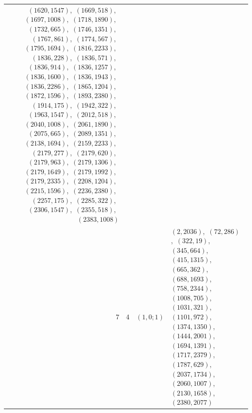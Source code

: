\documentclass[11pt]{article}
\begin{document}
\begin{longtable}{@{}rrl>{\raggedright\arraybackslash}p{}@{}}
$(1620,1547)$,\allowbreak\ $(1669,518)$,\allowbreak\ $(1697,1008)$,\allowbreak\ $(1718,1890)$,\allowbreak\ $(1732,665)$,\allowbreak\ $(1746,1351)$,\allowbreak\ $(1767,861)$,\allowbreak\ $(1774,567)$,\allowbreak\ $(1795,1694)$,\allowbreak\ $(1816,2233)$,\allowbreak\ $(1836,228)$,\allowbreak\ $(1836,571)$,\allowbreak\ $(1836,914)$,\allowbreak\ $(1836,1257)$,\allowbreak\ $(1836,1600)$,\allowbreak\ $(1836,1943)$,\allowbreak\ $(1836,2286)$,\allowbreak\ $(1865,1204)$,\allowbreak\ $(1872,1596)$,\allowbreak\ $(1893,2380)$,\allowbreak\ $(1914,175)$,\allowbreak\ $(1942,322)$,\allowbreak\ $(1963,1547)$,\allowbreak\ $(2012,518)$,\allowbreak\ $(2040,1008)$,\allowbreak\ $(2061,1890)$,\allowbreak\ $(2075,665)$,\allowbreak\ $(2089,1351)$,\allowbreak\ $(2138,1694)$,\allowbreak\ $(2159,2233)$,\allowbreak\ $(2179,277)$,\allowbreak\ $(2179,620)$,\allowbreak\ $(2179,963)$,\allowbreak\ $(2179,1306)$,\allowbreak\ $(2179,1649)$,\allowbreak\ $(2179,1992)$,\allowbreak\ $(2179,2335)$,\allowbreak\ $(2208,1204)$,\allowbreak\ $(2215,1596)$,\allowbreak\ $(2236,2380)$,\allowbreak\ $(2257,175)$,\allowbreak\ $(2285,322)$,\allowbreak\ $(2306,1547)$,\allowbreak\ $(2355,518)$,\allowbreak\ $(2383,1008)$\\
7 & 4 & $(1,0;1)$ & $(2,2036)$,\allowbreak\ $(72,286)$,\allowbreak\ $(322,19)$,\allowbreak\ $(345,664)$,\allowbreak\ $(415,1315)$,\allowbreak\ $(665,362)$,\allowbreak\ $(688,1693)$,\allowbreak\ $(758,2344)$,\allowbreak\ $(1008,705)$,\allowbreak\ $(1031,321)$,\allowbreak\ $(1101,972)$,\allowbreak\ $(1374,1350)$,\allowbreak\ $(1444,2001)$,\allowbreak\ $(1694,1391)$,\allowbreak\ $(1717,2379)$,\allowbreak\ $(1787,629)$,\allowbreak\ $(2037,1734)$,\allowbreak\ $(2060,1007)$,\allowbreak\ $(2130,1658)$,\allowbreak\ $(2380,2077)$\\

\end{longtable}
\end{document}
